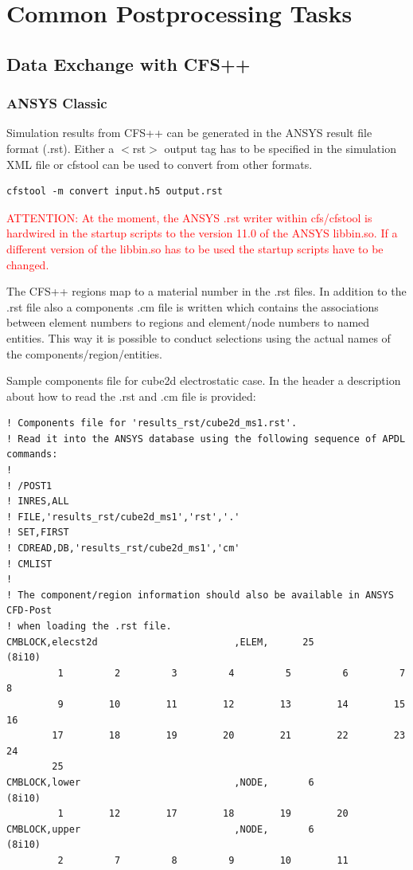 \chapter{Common Postprocessing Tasks}

\section{Data Exchange with CFS++}

\subsection{ANSYS Classic}
\label{sec:postproc_ansys}
Simulation results from CFS++ can be generated in the ANSYS result file format
(.rst). Either a $<$rst$>$ output tag  has to be specified in the simulation XML
file or cfstool can be used to convert from other formats.

\begin{verbatim}
cfstool -m convert input.h5 output.rst
\end{verbatim}

\textcolor{red}{ATTENTION:  At  the  moment,  the  ANSYS  .rst  writer  within
cfs/cfstool is  hardwired in the  startup scripts to  the version 11.0  of the
ANSYS libbin.so.  If  a different version of the libbin.so has  to be used the
startup scripts have to be changed.}

The CFS++ regions map  to a material number in the .rst  files. In addition to
the  .rst file  also  a components  .cm  file is  written  which contains  the
associations between  element numbers to  regions and element/node  numbers to
named entities. This way it is possible to conduct selections using the actual
names of the components/region/entities.

Sample  components  file  for  cube2d  electrostatic case.  In  the  header  a
description about how to read the .rst and .cm file is provided:
\begin{verbatim}
! Components file for 'results_rst/cube2d_ms1.rst'.
! Read it into the ANSYS database using the following sequence of APDL commands:
!
! /POST1
! INRES,ALL
! FILE,'results_rst/cube2d_ms1','rst','.'
! SET,FIRST
! CDREAD,DB,'results_rst/cube2d_ms1','cm'
! CMLIST
!
! The component/region information should also be available in ANSYS CFD-Post
! when loading the .rst file.
CMBLOCK,elecst2d                        ,ELEM,      25
(8i10)
         1         2         3         4         5         6         7         8
         9        10        11        12        13        14        15        16
        17        18        19        20        21        22        23        24
        25
CMBLOCK,lower                           ,NODE,       6
(8i10)
         1        12        17        18        19        20
CMBLOCK,upper                           ,NODE,       6
(8i10)
         2         7         8         9        10        11
\end{verbatim}

